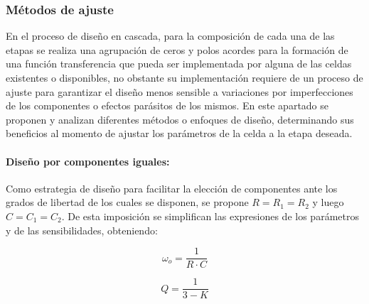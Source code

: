 \subsubsection{M\'etodos de ajuste}
En el proceso de dise\~no en cascada, para la composici\'on de cada una de las etapas se realiza una agrupaci\'on de ceros y polos acordes para la formaci\'on de una 
funci\'on transferencia que pueda ser implementada por alguna de las celdas existentes o disponibles, no obstante su implementaci\'on requiere de un proceso de ajuste para garantizar
el dise\~no menos sensible a variaciones por imperfecciones de los componentes o efectos par\'asitos de los mismos. En este apartado se proponen y analizan diferentes m\'etodos o enfoques de dise\~no, 
determinando sus beneficios al momento de ajustar los par\'ametros de la celda a la etapa deseada.

\paragraph{Dise\~no por componentes iguales:} Como estrategia de dise\~no para facilitar la elecci\'on de componentes ante los grados de libertad de los cuales se disponen,
se propone $R = R_1 = R_2$ y luego $C = C_1 = C_2$. De esta imposici\'on se simplifican las expresiones de los par\'ametros y de las sensibilidades, obteniendo:

\begin{equation}
    \omega_o = \frac{1}{R \cdot C}
    \label{eq:wo_ajuste_componentes_iguales}
\end{equation}

\begin{equation}
    Q = \frac{1}{3 - K}
    \label{eq:q_ajuste_componentes_iguales}
\end{equation}

